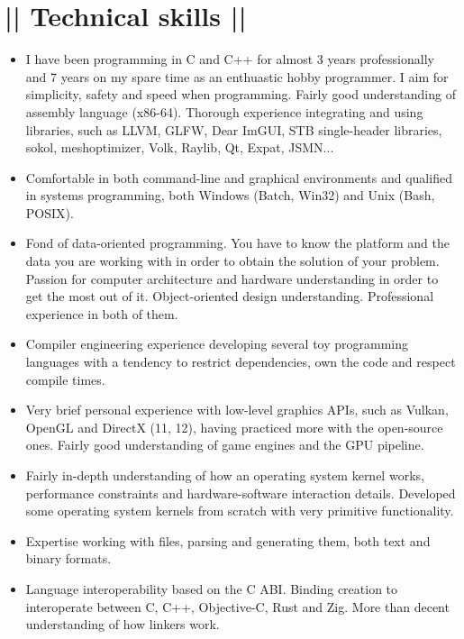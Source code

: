 \section*{|| Technical skills ||}
\begin{itemize}
	\item I have been programming in C and C++ for almost 3 years professionally and 7 years on my spare time as an enthuastic hobby programmer. I aim for simplicity, safety and speed when programming. Fairly good understanding of assembly language (x86-64). Thorough experience integrating and using libraries, such as LLVM, GLFW, Dear ImGUI, STB single-header libraries, sokol, meshoptimizer, Volk, Raylib, Qt, Expat, JSMN...
	
	\item Comfortable in both command-line and graphical environments and qualified in systems programming, both Windows (Batch, Win32) and Unix (Bash, POSIX).
	
	\item Fond of data-oriented programming. You have to know the platform and the data you are working with in order to obtain the solution of your problem. Passion for computer architecture and hardware understanding in order to get the most out of it. Object-oriented design understanding. Professional experience in both of them.
	
	\item Compiler engineering experience developing several toy programming languages with a tendency to restrict dependencies, own the code and respect compile times.
	
	\item Very brief personal experience with low-level graphics APIs, such as Vulkan, OpenGL and DirectX (11, 12), having practiced more with the open-source ones. Fairly good understanding of game engines and the GPU pipeline.
	
	\item Fairly in-depth understanding of how an operating system kernel works, performance constraints and hardware-software interaction details. Developed some operating system kernels from scratch with very primitive functionality.
	
	\item Expertise working with files, parsing and generating them, both text and binary formats.
	
	\item Language interoperability based on the C ABI. Binding creation to interoperate between C, C++, Objective-C, Rust and Zig. More than decent understanding of how linkers work.
	

\end{itemize}
